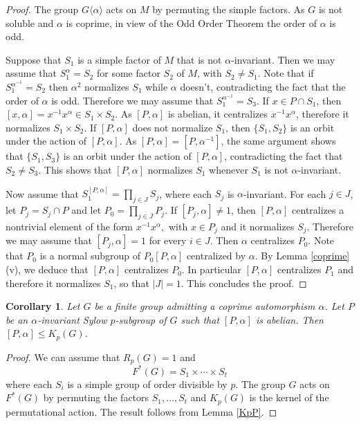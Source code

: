 \documentclass[12pt]{amsart}
\newtheorem{corollary}[theorem]{\bf Corollary}
\newcommand{\al }{\alpha }
\begin{document}
\begin{proof} The group $G\langle\alpha\rangle$ acts on $M$ by permuting the simple factors. 
As $G$ is not soluble and $\al$ is coprime, in view of the Odd Order Theorem \cite{fetho}  the order of $\al$ is odd.

Suppose that $S_1$ is a simple factor of $M$ that is not $\alpha$-invariant. Then we may assume that $S_1^\alpha=S_2$ for some factor $S_2$ of $M$, with $S_2\ne S_1$. Note that if $S_1^{\alpha^{-1}}=S_2$ then $\alpha^2$ normalizes $S_1$ while $\alpha$ doesn't, contradicting the fact that the order of $\alpha$ is odd. Therefore we may assume that $S_1^{\alpha^{-1}}=S_3$.  If $x\in P\cap S_1$, then $[x,\alpha]=x^{-1}x^\alpha\in S_1\times S_2$. As $[P,\alpha]$ is abelian, it centralizes $x^{-1}x^\alpha$, therefore it normalizes $S_1\times S_2$. If $[P,\alpha]$ does not normalize $S_1$, then $\{S_1,S_2\}$ is an orbit under the action of $[P,\alpha]$. As $[P,\alpha]=[P,\alpha^{-1}]$, the same argument shows that $\{S_1,S_3\}$ is an orbit under the action of $[P,\alpha]$, contradicting the fact that $S_2\ne S_3$. This shows that $[P,\alpha]$ normalizes $S_1$ whenever $S_1$ is not $\alpha$-invariant. 

Now assume that $S_1^{[P,\alpha]}=\prod_{j\in J}S_j$, where each $S_j$ is  $\alpha$-invariant. For each $j\in J$, let $P_j=S_j\cap P$ and let $P_0=\prod_{j\in J}P_j$. If $[P_j, \alpha]\ne 1$, then $[P,\alpha]$ centralizes a nontrivial element of the form  $x^{-1}x^\alpha,$ with $x\in P_j$ and it normalizes $S_j$. Therefore we may assume that $[P_j,\alpha]=1$ for every $i\in J$.  
Then $\alpha$ centralizes $P_0$. Note that $P_0$ is a normal subgroup of $P_0[P,\alpha]$ centralized by $\al$. 
By Lemma \ref{coprime} (v), we deduce that  $[P,\alpha]$ centralizes $P_0$. 
In particular  $[P,\alpha]$ centralizes $P_1$ and therefore it normalizes $S_1$, so that $|J|=1$. This concludes the proof. 
\end{proof}

\begin{corollary}\label{Kp} Let $G$ be a finite group admitting a coprime automorphism $\alpha$. Let $P$ be an $\alpha$-invariant Sylow $p$-subgroup of $G$ such that $[P,\alpha]$ is abelian. Then $[P,\alpha]\le K_p(G)$.
\end{corollary}
\begin{proof} We can assume that $R_p(G)=1$ and 
\[F^*(G)=S_1\times\cdots\times S_t\] 
where each $S_i$ is a 
  simple group of order divisible by $p$. The group $G$ acts on $F^*(G)$ by permuting the factors $S_1,\dots, S_t$ and $K_p(G)$ is the kernel of the permutational action. The result follows from Lemma \ref{KpP}.
\end{proof}
\end{document}
